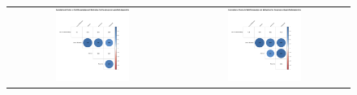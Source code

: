 \begin{figure}[htb]
\begin{tabular}{cc}
 \includegraphics[width=0.45\textwidth]{images/chap-evaluation/corr-effective-second/non-gamifiedApprentice1.png}&
 \includegraphics[width=0.45\textwidth]{images/chap-evaluation/corr-effective-second/ont-gamifiedApprentice1.png}
 \end{tabular}
 \fautor
\end{figure}


